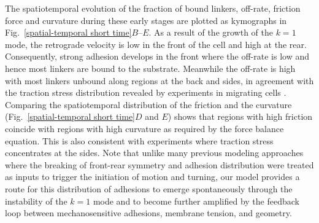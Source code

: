 \documentclass[12pt]{article}
\begin{document}
        The spatiotemporal evolution of the fraction of bound linkers, off-rate, friction force and curvature during these early stages are plotted as kymographs in Fig.~\ref{spatial-temporal short time}$B$--$E$. 
        As a result of the growth of the $k=1$ mode, the retrograde velocity is low in the front of the cell and high at the rear. 
        Consequently, strong adhesion develops in the front where the off-rate is low and hence most linkers are bound to the substrate. Meanwhile the off-rate is high with most linkers unbound along regions at the back and sides, in agreement with the traction stress distribution revealed by experiments in migrating cells \cite{fournier2010force}. 
        Comparing the spatiotemporal distribution of the friction and the curvature (Fig.~\ref{spatial-temporal short time}$D$ and $E$) shows that regions with high friction coincide with regions with high curvature as required by the force balance equation. 
        This is also consistent with experiments \cite{fournier2010force} where traction stress concentrates at the sides. 
        Note that unlike many previous modeling approaches \cite{barnhart2010bipedal,lee2020modeling} where the breaking of front-rear symmetry and adhesion distribution were treated as inputs to trigger the initiation of motion and turning, our model provides a route for this distribution of adhesions to emerge spontaneously through the instability of the $k=1$ mode and to become further amplified by the feedback loop between mechanosensitive adhesions, membrane tension, and geometry. 
\end{document}
